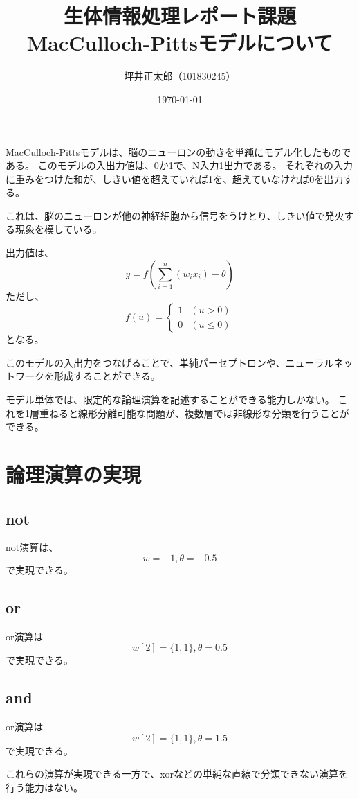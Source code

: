 \documentclass[a4paper,10pt]{jsarticle}
\begin{document}
\title{生体情報処理レポート課題\\
  MacCulloch-Pittsモデルについて}
\author{坪井正太郎（101830245）}
\date{\today}
\maketitle
\section{}
MacCulloch-Pittsモデルは、脳のニューロンの動きを単純にモデル化したものである。
このモデルの入出力値は、0か1で、N入力1出力である。
それぞれの入力に重みをつけた和が、しきい値を超えていれば1を、超えていなければ0を出力する。

これは、脳のニューロンが他の神経細胞から信号をうけとり、しきい値で発火する現象を模している。

出力値は、
\[y=f
  \left(
  \sum_{i=1}^{n}(w_ix_i)-\theta
  \right)
\]
ただし、
\[f(u)=
  \begin{cases}
    1 & (u>0)      \\
    0 & (u\leq  0)
  \end{cases}
\]
となる。

このモデルの入出力をつなげることで、単純パーセプトロンや、ニューラルネットワークを形成することができる。

モデル単体では、限定的な論理演算を記述することができる能力しかない。
これを1層重ねると線形分離可能な問題が、複数層では非線形な分類を行うことができる。

\section{論理演算の実現}
\subsection{not}
not演算は、
\[w=-1,\theta =-0.5\]
で実現できる。

\subsection{or}
or演算は
\[w[2]=\{1,1\},\theta =0.5\]
で実現できる。

\subsection{and}
or演算は
\[w[2]=\{1,1\},\theta =1.5\]
で実現できる。

これらの演算が実現できる一方で、xorなどの単純な直線で分類できない演算を行う能力はない。
\end{document}
